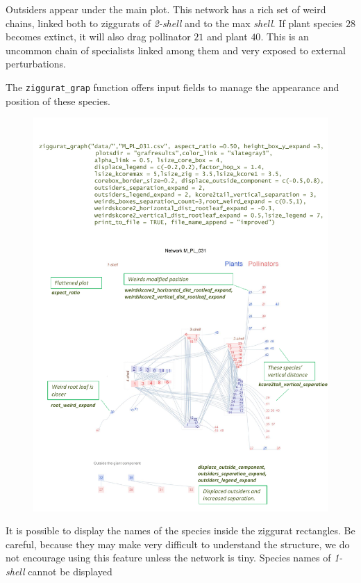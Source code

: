 \documentclass[12pt]{article}
\begin{document}
Outsiders appear under the main plot. This network has a rich set of weird chains, linked both to ziggurats of \textit{2-shell} and to the
max \textit{shell}. If plant species $28$ becomes extinct, it will also drag pollinator $21$ and plant $40$. This is an uncommon chain of
specialists linked among them and very exposed to external perturbations.

The \texttt{ziggurat\_grap} function offers input fields to manage the appearance and position of these species.

\clearpage
\begin{figure}[hp!]
\centering
\includegraphics[scale=0.8]{M_PL_031_ziggurat_improved.pdf}
\label{fig:KMAN_ziggurat_031_improved}
\end{figure}


\clearpage

It is possible to display the names of the species inside the ziggurat rectangles. Be careful, because they may make
very difficult to understand the structure, we do not encourage using this feature unless the network is tiny. Species
names of \textit{1-shell} cannot be displayed
\end{document}
